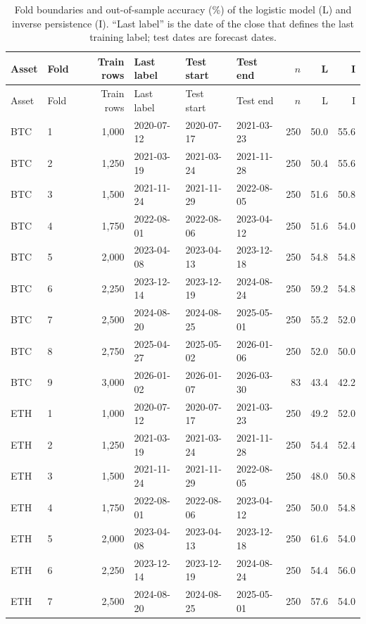 \documentclass[preprint,12pt,authoryear,a4paper]{elsarticle}
\begin{document}
\begin{center}\small
\setlength{\tabcolsep}{4pt}
\begin{longtable}{@{}llrlllrrr@{}}
\caption{Fold boundaries and out-of-sample accuracy (\%) of the logistic model (L)
and inverse persistence (I). ``Last label'' is the date of the close that defines
the last training label; test dates are forecast dates.}
\label{tab:folds}\\
\toprule
Asset & Fold & Train rows & Last label & Test start & Test end & $n$ & L & I \\
\midrule
\endfirsthead
\toprule
Asset & Fold & Train rows & Last label & Test start & Test end & $n$ & L & I \\
\midrule
\endhead
\bottomrule
\endfoot
BTC  & 1 & 1,000 & 2020-07-12 & 2020-07-17 & 2021-03-23 & 250 & 50.0 & 55.6 \\
BTC  & 2 & 1,250 & 2021-03-19 & 2021-03-24 & 2021-11-28 & 250 & 50.4 & 55.6 \\
BTC  & 3 & 1,500 & 2021-11-24 & 2021-11-29 & 2022-08-05 & 250 & 51.6 & 50.8 \\
BTC  & 4 & 1,750 & 2022-08-01 & 2022-08-06 & 2023-04-12 & 250 & 51.6 & 54.0 \\
BTC  & 5 & 2,000 & 2023-04-08 & 2023-04-13 & 2023-12-18 & 250 & 54.8 & 54.8 \\
BTC  & 6 & 2,250 & 2023-12-14 & 2023-12-19 & 2024-08-24 & 250 & 59.2 & 54.8 \\
BTC  & 7 & 2,500 & 2024-08-20 & 2024-08-25 & 2025-05-01 & 250 & 55.2 & 52.0 \\
BTC  & 8 & 2,750 & 2025-04-27 & 2025-05-02 & 2026-01-06 & 250 & 52.0 & 50.0 \\
BTC  & 9 & 3,000 & 2026-01-02 & 2026-01-07 & 2026-03-30 & 83  & 43.4 & 42.2 \\
\midrule
ETH  & 1 & 1,000 & 2020-07-12 & 2020-07-17 & 2021-03-23 & 250 & 49.2 & 52.0 \\
ETH  & 2 & 1,250 & 2021-03-19 & 2021-03-24 & 2021-11-28 & 250 & 54.4 & 52.4 \\
ETH  & 3 & 1,500 & 2021-11-24 & 2021-11-29 & 2022-08-05 & 250 & 48.0 & 50.8 \\
ETH  & 4 & 1,750 & 2022-08-01 & 2022-08-06 & 2023-04-12 & 250 & 50.0 & 54.8 \\
ETH  & 5 & 2,000 & 2023-04-08 & 2023-04-13 & 2023-12-18 & 250 & 61.6 & 54.0 \\
ETH  & 6 & 2,250 & 2023-12-14 & 2023-12-19 & 2024-08-24 & 250 & 54.4 & 56.0 \\
ETH  & 7 & 2,500 & 2024-08-20 & 2024-08-25 & 2025-05-01 & 250 & 57.6 & 54.0 \\

\end{longtable}
\end{center}
\end{document}
